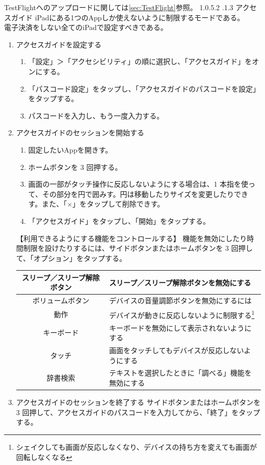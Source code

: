 \documentclass[dvipdfmx,jb5]{jarticle}
\makeatletter
\newcommand{\subsubsubsection}{\@startsection{paragraph}{4}{\z@}%
    {1.0\Cvs \@plus.5\Cdp \@minus.2\Cdp}%
    {.1\Cvs \@plus.3\Cdp}%
    {\reset@font}
  }
\makeatother
\begin{document}
  TestFlightへのアップロードに関しては\ref{sec:TestFlight}参照。
  \subsubsubsection{アクセスガイド}
  iPadにある1つのAppしか使えないように制限するモードである。\\
  電子決済をしない全てのiPadで設定すべきである。
  \begin{enumerate}
   \item アクセスガイドを設定する
   \begin{enumerate}[手順1.]
    \item 「設定」＞「アクセシビリティ」の順に選択し、「アクセスガイド」をオンにする。
    \item 「パスコード設定」をタップし、「アクセスガイドのパスコードを設定」をタップする。
    \item パスコードを入力し、もう一度入力する。
   \end{enumerate}
   \item アクセスガイドのセッションを開始する
   \begin{enumerate}[手順1.]
    \item 固定したいAppを開きす。
    \item ホームボタンを 3 回押する。
    \item 画面の一部がタッチ操作に反応しないようにする場合は、1 本指を使って、その部分を円で囲みす。円は移動したりサイズを変更したりできす。また、「$\times$」をタップして削除できす。
    \item 「アクセスガイド」をタップし、「開始」をタップする。
   \end{enumerate}
   \begin{itembox}[l]{【利用できるようにする機能をコントロールする】}
    機能を無効にしたり時間制限を設けたりするには、サイドボタンまたはホームボタンを 3 回押して、「オプション」をタップする。
    \begin{center}
    \begin{tabular}{|c|l|}\hline
     スリープ／スリープ解除ボタン&スリープ／スリープ解除ボタンを無効にする\\ \hline
     ボリュームボタン&デバイスの音量調節ボタンを無効にするには\\ \hline
     動作&デバイスが動きに反応しないように制限する\footnote{シェイクしても画面が反応しなくなり、デバイスの持ち方を変えても画面が回転しなくなる}\\ \hline
     キーボード&キーボードを無効にして表示されないようにする\\ \hline
     タッチ&画面をタッチしてもデバイスが反応しないようにする\\ \hline
     辞書検索&テキストを選択したときに「調べる」機能を無効にする\\ \hline
    \end{tabular}
    \end{center}
   \end{itembox}
   \item アクセスガイドのセッションを終了する
   サイドボタンまたはホームボタンを 3 回押して、アクセスガイドのパスコードを入力してから、「終了」をタップする。
  \end{enumerate}
\end{document}
